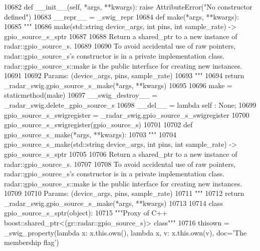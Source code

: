 \begin{DoxyCode}
{{{{{{{{{{{{{{{{{{{{{{{{{{{{{{{{{{10682     \textcolor{keyword}{def }__init__(self, *args, **kwargs): \textcolor{keywordflow}{raise} AttributeError(\textcolor{stringliteral}{"No constructor defined"})
10683     \_\_repr\_\_ = \_swig\_repr
10684     \textcolor{keyword}{def }make(*args, **kwargs):
10685         \textcolor{stringliteral}{"""}
10686 \textcolor{stringliteral}{        make(std::string device\_args, int pins, int sample\_rate) -> gpio\_source\_s\_sptr}
10687 \textcolor{stringliteral}{}
10688 \textcolor{stringliteral}{        Return a shared\_ptr to a new instance of radar::gpio\_source\_s.}
10689 \textcolor{stringliteral}{}
10690 \textcolor{stringliteral}{        To avoid accidental use of raw pointers, radar::gpio\_source\_s's constructor is in a private
       implementation class. radar::gpio\_source\_s::make is the public interface for creating new instances.}
10691 \textcolor{stringliteral}{}
10692 \textcolor{stringliteral}{        Params: (device\_args, pins, sample\_rate)}
10693 \textcolor{stringliteral}{        """}
10694         \textcolor{keywordflow}{return} \_radar\_swig.gpio\_source\_s\_make(*args, **kwargs)
10695 
10696     make = staticmethod(make)
10697     \_\_swig\_destroy\_\_ = \_radar\_swig.delete\_gpio\_source\_s
10698     \_\_del\_\_ = \textcolor{keyword}{lambda} self : \textcolor{keywordtype}{None};
10699 gpio\_source\_s\_swigregister = \_radar\_swig.gpio\_source\_s\_swigregister
10700 gpio_source_s_swigregister(gpio\_source\_s)
10701 
10702 \textcolor{keyword}{def }gpio_source_s_make(*args, **kwargs):
10703   \textcolor{stringliteral}{"""}
10704 \textcolor{stringliteral}{    gpio\_source\_s\_make(std::string device\_args, int pins, int sample\_rate) -> gpio\_source\_s\_sptr}
10705 \textcolor{stringliteral}{}
10706 \textcolor{stringliteral}{    Return a shared\_ptr to a new instance of radar::gpio\_source\_s.}
10707 \textcolor{stringliteral}{}
10708 \textcolor{stringliteral}{    To avoid accidental use of raw pointers, radar::gpio\_source\_s's constructor is in a private
       implementation class. radar::gpio\_source\_s::make is the public interface for creating new instances.}
10709 \textcolor{stringliteral}{}
10710 \textcolor{stringliteral}{    Params: (device\_args, pins, sample\_rate)}
10711 \textcolor{stringliteral}{    """}
10712   \textcolor{keywordflow}{return} \_radar\_swig.gpio\_source\_s\_make(*args, **kwargs)
10713 
10714 \textcolor{keyword}{class }gpio_source_s_sptr(object):
10715     \textcolor{stringliteral}{"""Proxy of C++ boost::shared\_ptr<(gr::radar::gpio\_source\_s)> class"""}
10716     thisown = _swig_property(\textcolor{keyword}{lambda} x: x.this.own(), \textcolor{keyword}{lambda} x, v: x.this.own(v), doc=\textcolor{stringliteral}{'The membership flag'})
}}}}}}}}}}}}}}}}}}}}}}}}}}}}}}}}}}
\end{DoxyCode}
